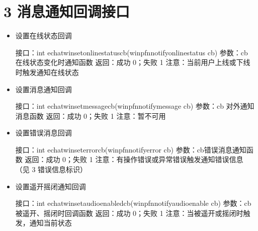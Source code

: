 \documentclass[letterpaper,10pt,english]{sphinxmanual}
\begin{document}
\section{3 消息通知回调接口}
\label{\detokenize{c_win:id12}}\begin{itemize}
\item {} 
设置在线状态回调

%
\begin{sphinxVerbatim}[commandchars=\\\{\}]
接口：int echat\PYGZus{}win\PYGZus{}set\PYGZus{}online\PYGZus{}status\PYGZus{}cb(win\PYGZus{}pfn\PYGZus{}notify\PYGZus{}online\PYGZus{}status cb)
参数：cb 在线状态变化时通知函数
返回：成功 0；失败 \PYGZhy{}1
注意：当前用户上线或下线时触发通知在线状态
\end{sphinxVerbatim}

\item {} 
设置消息通知回调

%
\begin{sphinxVerbatim}[commandchars=\\\{\}]
接口：int echat\PYGZus{}win\PYGZus{}set\PYGZus{}message\PYGZus{}cb(win\PYGZus{}pfn\PYGZus{}notify\PYGZus{}message cb)
参数：cb 对外通知消息函数
返回：成功 0；失败 \PYGZhy{}1
注意：暂不可用
\end{sphinxVerbatim}

\item {} 
设置错误消息回调

%
\begin{sphinxVerbatim}[commandchars=\\\{\}]
接口：int echat\PYGZus{}win\PYGZus{}set\PYGZus{}error\PYGZus{}cb(win\PYGZus{}pfn\PYGZus{}notify\PYGZus{}error cb)
参数：cb错误消息通知函数
返回：成功 0；失败 \PYGZhy{}1
注意：有操作错误或异常错误触发通知错误信息（见 3 错误信息标识）
\end{sphinxVerbatim}

\item {} 
设置遥开摇闭通知回调

%
\begin{sphinxVerbatim}[commandchars=\\\{\}]
接口：int echat\PYGZus{}win\PYGZus{}set\PYGZus{}audio\PYGZus{}enabled\PYGZus{}cb(win\PYGZus{}pfn\PYGZus{}notify\PYGZus{}audio\PYGZus{}enable cb)
参数：cb被遥开、摇闭时回调函数
返回：成功 0；失败 \PYGZhy{}1
注意：当被遥开或摇闭时触发，通知当前状态
\end{sphinxVerbatim}


\end{itemize}
\end{document}
